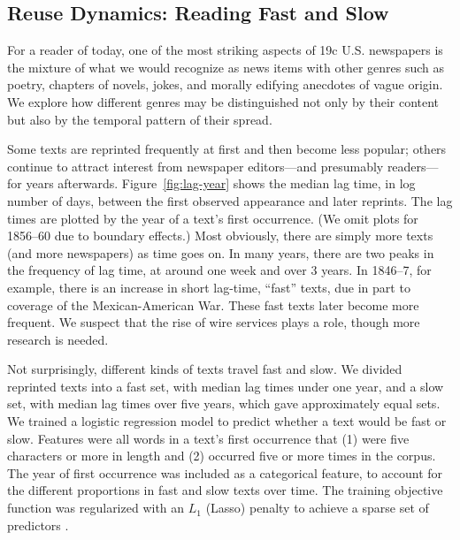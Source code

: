 \documentclass[pdftex,11pt]{article}
\begin{document}
\subsection{Reuse Dynamics: Reading Fast and Slow}
\label{sec:fast-slow}

For a reader of today, one of the most striking aspects of 19c
U.S. newspapers is the mixture of what we would recognize as news
items with other genres such as poetry, chapters of novels, jokes, and
morally edifying anecdotes of vague origin.  We explore how different
genres may be distinguished not only by their content but also by the
temporal pattern of their spread.

Some texts are reprinted frequently at first and then become less
popular; others continue to attract interest from newspaper
editors---and presumably readers---for years afterwards.
Figure~\ref{fig:lag-year} shows the median lag time, in log number of
days, between the first observed appearance and later reprints.  The
lag times are plotted by the year of a text's first occurrence.  (We
omit plots for 1856--60 due to boundary effects.)  Most obviously,
there are simply more texts (and more newspapers) as time goes on.  In
many years, there are two peaks in the frequency of lag time, at
around one week and over 3 years.  In 1846--7, for example, there is
an increase in short lag-time, ``fast'' texts, due in part to coverage
of the Mexican-American War.  These fast texts later become more
frequent.  We suspect that the rise of wire services plays a role,
though more research is needed.

Not surprisingly, different kinds of texts travel fast and slow.  We
divided reprinted texts into a fast set, with median lag times under
one year, and a slow set, with median lag times over five years, which
gave approximately equal sets.  We trained a logistic regression model
to predict whether a text would be fast or slow.  Features were all
words in a text's first occurrence that (1) were five characters or
more in length and (2) occurred five or more times in the corpus.  The
year of first occurrence was included as a categorical feature, to
account for the different proportions in fast and slow texts over
time.  The training objective function was regularized with an $L_1$
(Lasso) penalty to achieve a sparse set of predictors
\cite{friedman08:_regul_paths_gener_linear_model_coord_descen}.
\end{document}
